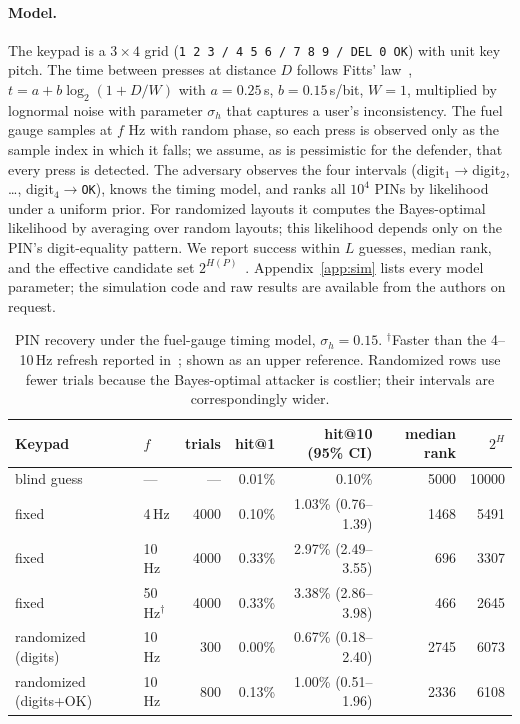 \documentclass[11pt]{article}
\theoremstyle{remark}
\begin{document}
\paragraph{Model.} The keypad is a $3\times4$ grid (\texttt{1 2 3 / 4 5 6 / 7 8 9 / DEL 0 OK}) with unit key pitch. The time between presses at distance $D$ follows Fitts' law~\cite{fitts54}, $t = a + b\log_2(1 + D/W)$ with $a{=}0.25$\,s, $b{=}0.15$\,s/bit, $W{=}1$, multiplied by lognormal noise with parameter $\sigma_h$ that captures a user's inconsistency. The fuel gauge samples at $f$ Hz with random phase, so each press is observed only as the sample index in which it falls; we assume, as is pessimistic for the defender, that every press is detected. The adversary observes the four intervals (digit$_1\!\to$digit$_2$, \dots, digit$_4\!\to$\texttt{OK}), knows the timing model, and ranks all $10^4$ PINs by likelihood under a uniform prior. For randomized layouts it computes the Bayes-optimal likelihood by averaging over random layouts; this likelihood depends only on the PIN's digit-equality pattern. We report success within $L$ guesses, median rank, and the effective candidate set $2^{H(P)}$~\cite{sd03}. Appendix~\ref{app:sim} lists every model parameter; the simulation code and raw results are available from the authors on request.

\begin{table}[t]
\centering\small
\begin{tabular}{@{}llrrrrr@{}}
\toprule
Keypad & $f$ & trials & hit@1 & hit@10 (95\% CI) & median rank & $2^{H}$ \\
\midrule
blind guess & --- & --- & 0.01\% & 0.10\% & 5000 & 10000 \\
fixed & 4\,Hz & 4000 & 0.10\% & 1.03\% (0.76--1.39) & 1468 & 5491 \\
fixed & 10\,Hz & 4000 & 0.33\% & 2.97\% (2.49--3.55) & 696 & 3307 \\
fixed & 50\,Hz$^\dagger$ & 4000 & 0.33\% & 3.38\% (2.86--3.98) & 466 & 2645 \\
randomized (digits) & 10\,Hz & 300 & 0.00\% & 0.67\% (0.18--2.40) & 2745 & 6073 \\
randomized (digits+OK) & 10\,Hz & 800 & 0.13\% & 1.00\% (0.51--1.96) & 2336 & 6108 \\
\bottomrule
\end{tabular}
\caption{PIN recovery under the fuel-gauge timing model, $\sigma_h = 0.15$. $^\dagger$Faster than the 4--10\,Hz refresh reported in~\cite{gn23}; shown as an upper reference. Randomized rows use fewer trials because the Bayes-optimal attacker is costlier; their intervals are correspondingly wider.}
\label{tab:pin}
\end{table}
\end{document}
